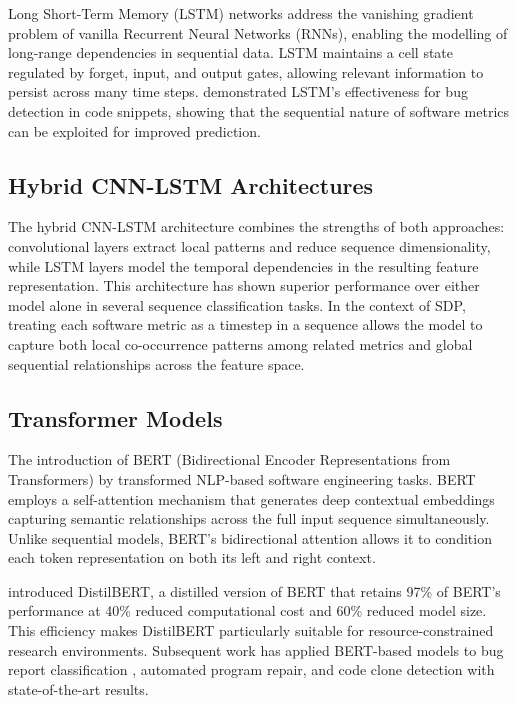 \documentclass[12pt,a4paper,oneside]{report}
\begin{document}
Long Short-Term Memory (LSTM) networks \citep{hochreiter1997} address the vanishing gradient problem of vanilla Recurrent Neural Networks (RNNs), enabling the modelling of long-range dependencies in sequential data. LSTM maintains a cell state regulated by forget, input, and output gates, allowing relevant information to persist across many time steps. \citet{thong2018} demonstrated LSTM's effectiveness for bug detection in code snippets, showing that the sequential nature of software metrics can be exploited for improved prediction.

\subsection{Hybrid CNN-LSTM Architectures}

The hybrid CNN-LSTM architecture combines the strengths of both approaches: convolutional layers extract local patterns and reduce sequence dimensionality, while LSTM layers model the temporal dependencies in the resulting feature representation. This architecture has shown superior performance over either model alone in several sequence classification tasks. In the context of SDP, treating each software metric as a timestep in a sequence allows the model to capture both local co-occurrence patterns among related metrics and global sequential relationships across the feature space.

\subsection{Transformer Models}

The introduction of BERT (Bidirectional Encoder Representations from Transformers) by \citet{devlin2019} transformed NLP-based software engineering tasks. BERT employs a self-attention mechanism that generates deep contextual embeddings capturing semantic relationships across the full input sequence simultaneously. Unlike sequential models, BERT's bidirectional attention allows it to condition each token representation on both its left and right context.

\citet{sanh2019} introduced DistilBERT, a distilled version of BERT that retains 97\% of BERT's performance at 40\% reduced computational cost and 60\% reduced model size. This efficiency makes DistilBERT particularly suitable for resource-constrained research environments. Subsequent work has applied BERT-based models to bug report classification \citep{chen2022}, automated program repair, and code clone detection with state-of-the-art results.
\end{document}
